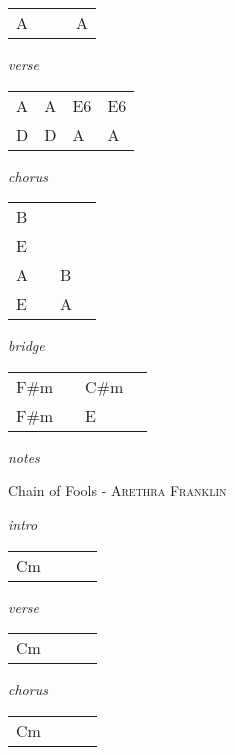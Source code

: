 \documentclass[12pt]{article}
\begin{document}
\begin{tabular}{|P{1.25in}|P{1.25in}|P{1.25in}|P{1.25in}|}
  A &   &   &  A \\

\end{tabular}

\textit{verse}

\begin{tabular}{|P{1.25in}|P{1.25in}|P{1.25in}|P{1.25in}|}
  A & A  &  E6 &  E6 \\
  D & D  &  A &  A \\
\end{tabular}

\textit{chorus}

\begin{tabular}{|P{1.25in}|P{1.25in}|P{1.25in}|P{1.25in}|}
  B &   &   &   \\
  E &   &   &   \\
\hline
  A &   &  B &  \\
  E &   &  A &   \\
\end{tabular}

\textit{bridge}

\begin{tabular}{|P{1.25in}|P{1.25in}|P{1.25in}|P{1.25in}|}
  F\#m &   & C\#m  &   \\
  F\#m &   &  E    & \\
\end{tabular}

\textit{notes}
  

\newpage

{\Huge Chain of Fools} {\huge - \textsc{Arethra Franklin}}

\huge
\textit{intro}

\begin{tabular}{|P{1.25in}|P{1.25in}|P{1.25in}|P{1.25in}|}
  Cm &   &   &   \\
\end{tabular}

\textit{verse}

\begin{tabular}{|P{1.25in}|P{1.25in}|P{1.25in}|P{1.25in}|}
  Cm &   &   &   \\
\end{tabular}

\textit{chorus}

\begin{tabular}{|P{1.25in}|P{1.25in}|P{1.25in}|P{1.25in}|}
  Cm &   &   &   \\
\end{tabular}
\end{document}
